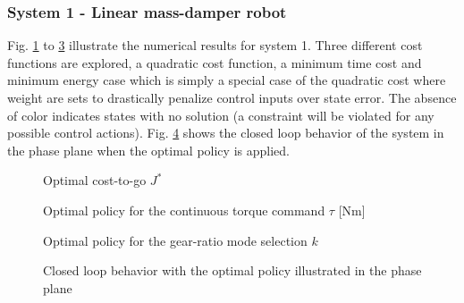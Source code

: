 \subsubsection{System 1 - Linear mass-damper robot}
Fig. \ref{fig:J} to \ref{fig:u1} illustrate the numerical results for system 1. Three different cost functions are explored, a quadratic cost function, a minimum time cost and minimum energy case which is simply a special case of the quadratic cost where weight are sets to drastically penalize control inputs over state error. The absence of color indicates states with no solution (a constraint will be violated for any possible control actions). Fig. \ref{fig:phase_plane} shows the closed loop behavior of the system in the phase plane when the optimal policy is applied.
%
\begin{figure}[p]
				\vspace{-2pt}
        \centering
        \caption{Optimal cost-to-go $J^*$}\label{fig:J}
\end{figure}
%
\begin{figure}[p]
				\vspace{-2pt}
        \centering
        \caption{Optimal policy for the continuous torque command $\tau$ [Nm]}\label{fig:u0}
\end{figure}
%
\begin{figure}[p]
				\vspace{-2pt}
        \centering
        \caption{Optimal policy for the gear-ratio mode selection $k$}\label{fig:u1}
\end{figure}
%
\begin{figure}[p]
				\vspace{-2pt}
        \centering
        \caption[Closed loop behavior in the phase plane]{Closed loop behavior with the optimal policy illustrated in the phase plane}\label{fig:phase_plane}
\end{figure}

